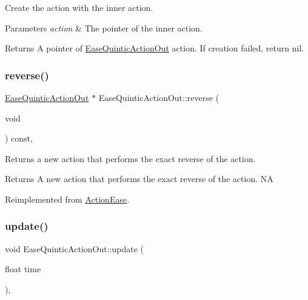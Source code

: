 Create the action with the inner action. 


\begin{DoxyParams}{Parameters}
{\em action} & The pointer of the inner action. \\
\hline
\end{DoxyParams}
\begin{DoxyReturn}{Returns}
A pointer of \hyperlink{classEaseQuinticActionOut}{Ease\+Quintic\+Action\+Out} action. If creation failed, return nil. 
\end{DoxyReturn}
\mbox{\label{classEaseQuinticActionOut_a9a871dbf78c897831b89f17e19e56b12}} 
\subsubsection{\texorpdfstring{reverse()}{reverse()}}
{\footnotesize\ttfamily \hyperlink{classEaseQuinticActionOut}{Ease\+Quintic\+Action\+Out} $\ast$ Ease\+Quintic\+Action\+Out\+::reverse (\begin{DoxyParamCaption}\item[{void}]{ }\end{DoxyParamCaption}) const\hspace{0.3cm}{\ttfamily [override]}, {\ttfamily [virtual]}}

Returns a new action that performs the exact reverse of the action.

\begin{DoxyReturn}{Returns}
A new action that performs the exact reverse of the action.  NA 
\end{DoxyReturn}


Reimplemented from \hyperlink{classActionEase_ab99eb083fa033fae1d6c948fdc730782}{Action\+Ease}.

\mbox{\label{classEaseQuinticActionOut_ab78421446d94c0d0ded5329ed9a3716d}} 
\subsubsection{\texorpdfstring{update()}{update()}}
{\footnotesize\ttfamily void Ease\+Quintic\+Action\+Out\+::update (\begin{DoxyParamCaption}\item[{float}]{time }\end{DoxyParamCaption})\hspace{0.3cm}{\ttfamily [override]}, {\ttfamily [virtual]}}

